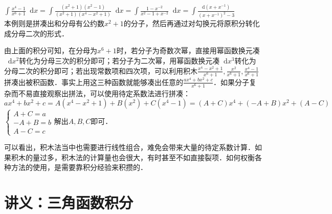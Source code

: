 \documentclass{ctexbook}
\newcommand*{\dif}{\mathop{}\!\mathrm{d}}
\begin{document}
$\int\frac{x^{4}-1}{x^{6}+1}\dif{x}=\int\frac{\left(x^{2}+1\right)\left(x^{2}-1\right)}{\left(x^{2}+1\right)\left(x^{4}-x^{2}+1\right)}\dif{x}=\int\frac{1-x^{-2}}{x^{2}-1+x^{-2}}\dif{x}=\int\frac{\mathrm{d}\left(x+x^{-1}\right)}{\left(x+x^{-1}\right)^{2}-3}$\\
本例则是拼凑出和分母有公约数$x^{2}+1$的分子，然后再通过对勾换元将原积分转化成分母二次的形式．\par
由上面的积分可知，在分母为$x^{6}+1$时，若分子为奇数次幂，直接用幂函数换元凑$\dif{x}^{2}$转化为分母三次的积分即可；若分子为二次幂，用幂函数换元凑$\dif{x}^{3}$转化为分母二次的积分即可；若出现常数项和四次项，可以利用积木$\frac{x^{4}-x^{2}+1}{x^{6}+1},\frac{x^{2}}{x^{6}+1},\frac{x^{4}-1}{x^{6}+1}$拼凑出被积函数．事实上用这三种函数就能够凑出任意的$\frac{ax^{4}+bx^{2}+c}{x^{6}+1}$．如果分子复杂而不易直接观察出拼法，可以使用待定系数法进行拼凑：\\
$ax^{4}+bx^{2}+c=A\left(x^{4}-x^{2}+1\right)+B\left(x^{2}\right)+C\left(x^{4}-1\right)=\left(A+C\right)x^{4}+\left(-A+B\right)x^{2}+\left(A-C\right)$\\
$\begin{cases}A+C=a\\-A+B=b\\A-C=c\end{cases}$解出$A,B,C$即可．\par
可以看出，积木法当中也需要进行线性组合，难免会带来大量的待定系数计算．如果积木的量过多，积木法的计算量也会很大，有时甚至不如直接裂项．如何权衡各种方法的使用，是需要靠积分经验来积攒的．\par
\chapter{讲义：三角函数积分}
\end{document}
